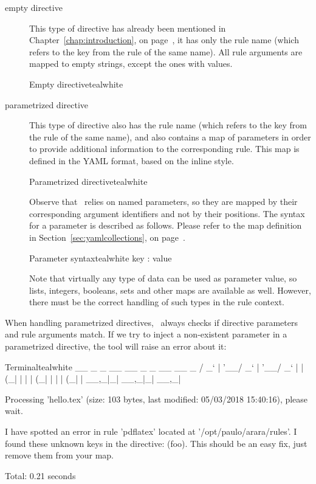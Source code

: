 \begin{description}
\item[empty directive] This type of directive has already been mentioned in Chapter~\ref{chap:introduction}, on page~\pageref{chap:introduction}, it has only the rule name (which refers to the  key from the rule of the same name). All rule arguments are mapped to empty strings, except the ones with  values.

\begin{codebox}{Empty directive}{teal}{\icnote}{white}
\end{codebox}

\item[parametrized directive] This type of directive also has the rule name (which refers to the  key from the rule of the same name), and also contains a map of parameters in order to provide additional information to the corresponding rule. This map is defined in the \gls{YAML} format, based on the inline style.

\begin{codebox}{Parametrized directive}{teal}{\icnote}{white}
\end{codebox}

Observe that \arara\ relies on named parameters, so they are mapped by their corresponding argument identifiers and not by their positions. The syntax for a parameter is described as follows. Please refer to the map definition in Section~\ref{sec:yamlcollections}, on page~\pageref{sec:yamlcollections}.

\begin{codebox}{Parameter syntax}{teal}{\icnote}{white}
key : value
\end{codebox}

Note that virtually any type of data can be used as parameter value, so lists, integers, booleans, sets and other maps are available as well. However, there must be the correct handling of such types in the rule context.
\end{description}

When handling parametrized directives, \arara\ always checks if directive parameters and rule arguments match. If we try to inject a non-existent parameter in a parametrized directive, the tool will raise an error about it:

\begin{codebox}{Terminal}{teal}{\icnote}{white}
  __ _ _ __ __ _ _ __ __ _ 
 / _` | '__/ _` | '__/ _` |
| (_| | | | (_| | | | (_| |
 \__,_|_|  \__,_|_|  \__,_|

Processing 'hello.tex' (size: 103 bytes, last modified:
05/03/2018 15:40:16), please wait.

I have spotted an error in rule 'pdflatex' located at
'/opt/paulo/arara/rules'. I found these unknown keys
in the directive: (foo). This should be an easy fix,
just remove them from your map.

Total: 0.21 seconds
\end{codebox}

